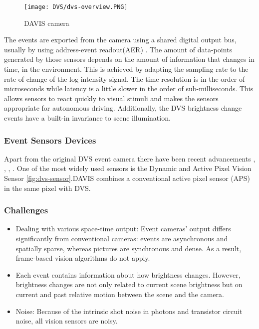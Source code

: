 \documentclass[12pt]{report}
\begin{document}
\begin{wrapfigure}{r}{0.5\textwidth} %
    \centering
     \texttt{[image: DVS/dvs-overview.PNG]}
    \caption{DAVIS camera}
    \label{fig:dvs-overview}
\end{wrapfigure}

The events are exported from the camera using a shared digital output bus, usually by using address-event readout(AER) \cite{boahen2004} \cite{liu2015} . The amount of data-points generated by those sensors depends on the amount of information that changes in time, in the environment. This is achieved by adapting the sampling rate to the rate of change of the log intensity signal. The time resolution is in the order of microseconds while latency is a little slower in the order of sub-milliseconds. This allows sensors to react quickly to visual stimuli and makes the sensors appropriate for autonomous driving. Additionally, the DVS brightness change events have a built-in invariance to scene illumination.

\subsubsection{Event Sensors Devices}
Apart from the original DVS event camera \cite{Lichtsteiner2008} there have been recent advancements \cite{posch2014} , \cite{liu2015}, \cite{indiveri2015}, \cite{delbruck2010} .
One of the most widely used sensors is the Dynamic and Active Pixel Vision Sensor \cite{davis} \ref{fig:dvs-sensor}.DAVIS combines a conventional active pixel sensor (APS) \cite{fossum1997} in the same pixel with DVS.   
\subsubsection{Challenges}
\begin{itemize}
    \item Dealing with various space-time output: Event cameras' output differs significantly from conventional cameras: events are asynchronous and spatially sparse, whereas pictures are synchronous and dense. As a result, frame-based vision algorithms do not apply.
    \item Each event contains information about how brightness changes. However, brightness changes are not only related to current scene brightness but on current and past relative motion between the scene and the camera.
    \item Noise: Because of the intrinsic shot noise in photons and transistor circuit noise, all vision sensors are noisy.
\end{itemize}
\end{document}
